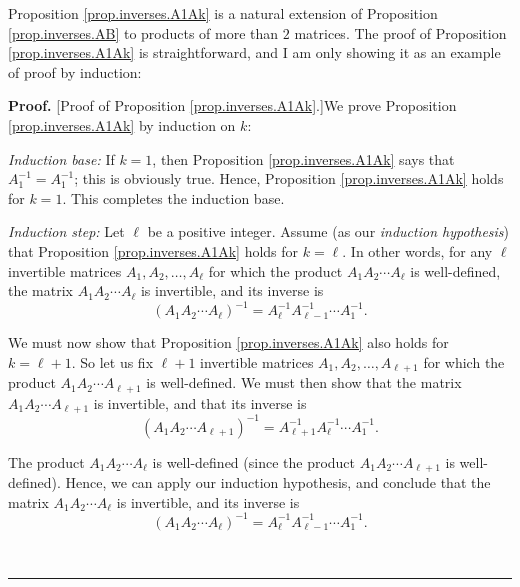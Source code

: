 \documentclass[numbers=enddot,12pt,final,onecolumn,notitlepage]{scrartcl}%
\theoremstyle{definition}
\newenvironment{proof}[1][Proof]{\noindent\textbf{#1.} }{\ \rule{0.5em}{0.5em}}
\begin{document}
Proposition \ref{prop.inverses.A1Ak} is a natural extension of Proposition
\ref{prop.inverses.AB} to products of more than $2$ matrices. The proof of
Proposition \ref{prop.inverses.A1Ak} is straightforward, and I am only showing
it as an example of proof by induction:

\begin{proof}
[Proof of Proposition \ref{prop.inverses.A1Ak}.]We prove Proposition
\ref{prop.inverses.A1Ak} by induction on $k$:

\textit{Induction base:} If $k=1$, then Proposition \ref{prop.inverses.A1Ak}
says that $A_{1}^{-1}=A_{1}^{-1}$; this is obviously true. Hence, Proposition
\ref{prop.inverses.A1Ak} holds for $k=1$. This completes the induction base.

\textit{Induction step:} Let $\ell$ be a positive integer. Assume (as our
\textit{induction hypothesis}) that Proposition \ref{prop.inverses.A1Ak} holds
for $k=\ell$. In other words, for any $\ell$ invertible matrices $A_{1}%
,A_{2},\ldots,A_{\ell}$ for which the product $A_{1}A_{2}\cdots A_{\ell}$ is
well-defined, the matrix $A_{1}A_{2}\cdots A_{\ell}$ is invertible, and its
inverse is%
\[
\left(  A_{1}A_{2}\cdots A_{\ell}\right)  ^{-1}=A_{\ell}^{-1}A_{\ell-1}%
^{-1}\cdots A_{1}^{-1}.
\]


We must now show that Proposition \ref{prop.inverses.A1Ak} also holds for
$k=\ell+1$. So let us fix $\ell+1$ invertible matrices $A_{1},A_{2}%
,\ldots,A_{\ell+1}$ for which the product $A_{1}A_{2}\cdots A_{\ell+1}$ is
well-defined. We must then show that the matrix $A_{1}A_{2}\cdots A_{\ell+1}$
is invertible, and that its inverse is
\[
\left(  A_{1}A_{2}\cdots A_{\ell+1}\right)  ^{-1}=A_{\ell+1}^{-1}A_{\ell}%
^{-1}\cdots A_{1}^{-1}.
\]


The product $A_{1}A_{2}\cdots A_{\ell}$ is well-defined (since the product
$A_{1}A_{2}\cdots A_{\ell+1}$ is well-defined). Hence, we can apply our
induction hypothesis, and conclude that the matrix $A_{1}A_{2}\cdots A_{\ell}$
is invertible, and its inverse is%
\[
\left(  A_{1}A_{2}\cdots A_{\ell}\right)  ^{-1}=A_{\ell}^{-1}A_{\ell-1}%
^{-1}\cdots A_{1}^{-1}.
\]



\end{proof}
\end{document}
